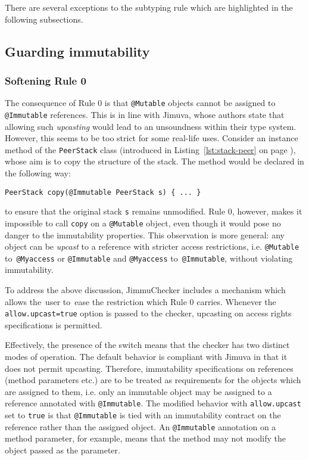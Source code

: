 \documentclass{pracamgr}
\theoremstyle{break}
\theoremstyle{break}
\theoremstyle{break}
\begin{document}
There are several exceptions to the subtyping rule which are
highlighted in the following subsections.

\subsection{Guarding immutability}

\subsubsection{Softening Rule 0}

The consequence of Rule 0 is that \texttt{@Mutable} objects cannot be
assigned to \texttt{@Immutable} re\-fe\-ren\-ces. This is in line with
Jimuva, whose authors state that allowing such \emph{upcasting} would
lead to an unsoundness within their type system. However, this seems
to be too strict for some real-life uses. Consider an instance method
of the \texttt{PeerStack} class (introduced in
Listing~\ref{lst:stack-peer} on page \pageref{lst:stack-peer}), whose
aim is to copy the structure of the stack. The method would be
declared in the following way:
\begin{lstlisting}
PeerStack copy(@Immutable PeerStack s) { ... }
\end{lstlisting}
to ensure that the original stack \texttt{s} remains unmodified. Rule
0, however, makes it impossible to call \texttt{copy} on a
\texttt{@Mutable} object, even though it would pose no danger to the
immutability properties. This observation is more general: any object
can be \emph{upcast} to a reference with stricter access restrictions,
i.e. \texttt{@Mutable} to~\texttt{@Myaccess} or \texttt{@Immutable}
and \texttt{@Myaccess} to~\texttt{@Immutable}, without violating
immutability.

To address the above discussion, JimmuChecker includes a mechanism
which allows the~user to~ease the restriction which Rule 0
carries. Whenever the \texttt{allow.upcast=true} option is passed to
the checker, upcasting on access rights specifications is permitted.

Effectively, the presence of the switch means that the checker has two
distinct modes of operation. The default behavior is compliant with
Jimuva in that it does not permit upcasting. Therefore, immutability
specifications on references (method parameters etc.) are to be
treated as requirements for the objects which are assigned to them,
i.e. only an immutable object may be assigned to a reference annotated
with \texttt{@Immutable}. The modified behavior with
\texttt{allow.upcast} set to \texttt{true} is that \texttt{@Immutable}
is tied with an immutability contract on the reference rather than the
assigned object. An \texttt{@Immutable} annotation on a method
parameter, for example, means that the method may not modify the
object passed as the parameter. 
\end{document}
